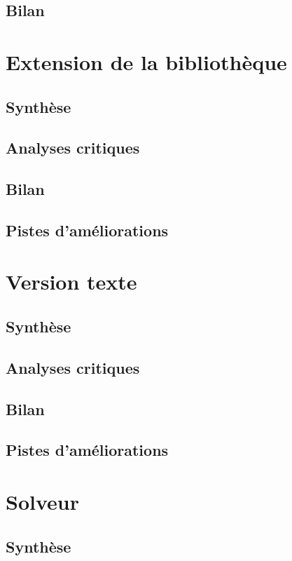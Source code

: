 \documentclass[12pt]{report}
\begin{document}
\section{Bilan}
\begin{normalsize}

\end{normalsize}


\chapter{Extension de la bibliothèque}
\section{Synthèse}
\section{Analyses critiques}
\section{Bilan}
\section{Pistes d'améliorations}

\chapter{Version texte}
\section{Synthèse}
\section{Analyses critiques}
\section{Bilan}
\section{Pistes d'améliorations}

\chapter{Solveur}
\section{Synthèse}
\end{document}
